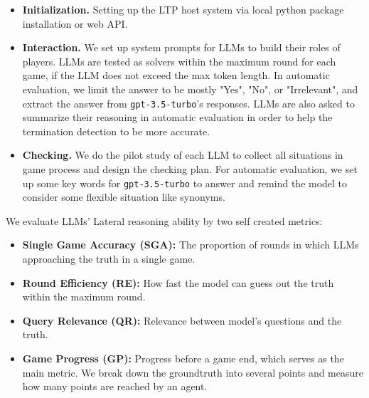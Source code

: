 \begin{itemize}[leftmargin=1.5em,itemsep=0pt,parsep=0.2em,topsep=0.0em,partopsep=0.0em]
    \item \textbf{Initialization.} Setting up the LTP host system via local python package installation or web API.
    
    \item \textbf{Interaction.} We set up system prompts for LLMs to build their roles of players. 
    LLMs are tested as solvers within the maximum round for each game, if the LLM does not exceed the max token length. 
    In automatic evaluation, we limit the answer to be mostly "Yes", "No", or "Irrelevant", and extract the answer from \texttt{gpt-3.5-turbo}'s responses.
    LLMs are also asked to summarize their reasoning in automatic evaluation in order to help the termination detection to be more accurate.
    
    \item \textbf{Checking.} We do the pilot study of each LLM to collect all situations in game process and design the checking plan. For automatic evaluation, we set up some key words for \texttt{gpt-3.5-turbo} to answer and remind the model to consider some flexible situation like synonyms. 
\end{itemize}

We evaluate LLMs' Lateral reasoning ability by two self created metrics:
\begin{itemize}[leftmargin=1.5em,itemsep=0pt,parsep=0.2em,topsep=0.0em,partopsep=0.0em]
    \item \textbf{Single Game Accuracy (SGA):} The proportion of rounds in which LLMs approaching the truth in a single game.
    \item \textbf{Round Efficiency (RE):} How fast the model can guess out the truth within the maximum round.
    \item \textbf{Query Relevance (QR):} Relevance between model's questions and the truth.
    \item \textbf{Game Progress (GP):} Progress before a game end, which serves as the main metric. We break down the groundtruth into several points and measure how many points are reached by an agent.
\end{itemize}

